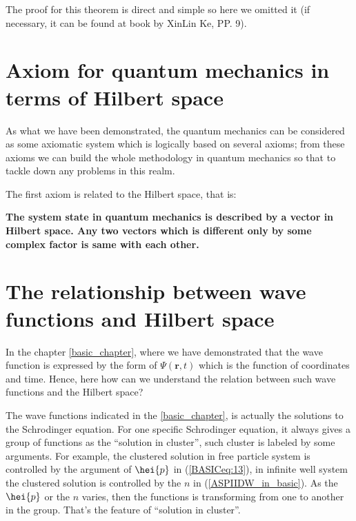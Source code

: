 The proof for this theorem is direct and simple so here we omitted
it (if necessary, it can be found at book by XinLin
Ke\cite{XingLinKe}, PP. 9).



\section{Axiom for quantum mechanics in terms of Hilbert space}
\label{sec:AFQMITOHS_in_Hilbert}

As what we have been demonstrated, the quantum mechanics can be
considered as some axiomatic system which is logically based on
several axioms; from these axioms we can build the whole methodology
in quantum mechanics so that to tackle down any problems in this
realm.

The first axiom is related to the Hilbert space, that is:
\begin{axiom}\label{axiom1}
\textbf{The system state in quantum mechanics is described by a
vector in
  Hilbert space. Any two vectors which is different only by some
  complex factor is same with each other.}
\end{axiom}


\section{The relationship between wave functions and Hilbert space}
\label{TRBWFAHS_in_Hilbert}
%
%
%
%
In the chapter \ref{basic_chapter}, where we have demonstrated that
the wave function is expressed by the form of $\Psi(\bm{r}, t)$ which
is the function of coordinates and time. Hence, here how can we
understand the relation between such wave functions and the Hilbert
space?

The wave functions indicated in the \ref{basic_chapter}, is actually
the solutions to the Schrodinger equation. For one specific
Schrodinger equation, it always gives a group of functions as the
``solution in cluster'', such cluster is labeled by some arguments.
For example, the clustered solution in free particle system is
controlled by the argument of $\hei{p}$ in (\ref{BASICeq:13}), in
infinite well system the clustered solution is controlled by the $n$
in (\ref{ASPIIDW_in_basic}). As the $\hei{p}$ or the $n$ varies, then
the functions is transforming from one to another in the group. That's
the feature of ``solution in cluster''.

